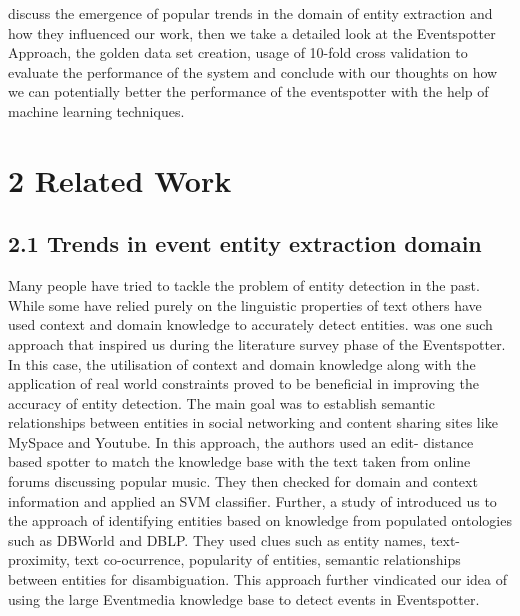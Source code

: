 \documentclass[a4paper,11pt]{report}
\begin{document}
discuss the emergence of popular trends in the domain of entity extraction and how they influenced our work, then we take a detailed look at the Eventspotter Approach, the golden data set creation, usage of 10-fold cross validation to evaluate the performance of the system and conclude with our thoughts on how we can potentially better the performance of the eventspotter with the help of machine learning techniques.



\chapter*{2 Related Work}

\section*{2.1 Trends in event entity extraction domain}
Many people have tried to tackle the problem of entity detection in the past. While some have relied purely on the linguistic properties of text others have used context and domain knowledge to accurately detect entities. \cite{Gruhl_contextand} was one such approach that inspired us during the literature survey phase of the Eventspotter. In this case, the utilisation of context and domain knowledge along with the application of real world constraints proved to be beneficial in improving the accuracy of entity detection. The main goal was to establish semantic relationships between entities in social networking and content sharing sites like MySpace and Youtube. In this approach, the authors used an edit- distance based spotter to match the knowledge base with the text taken from online forums discussing popular music. They then checked for domain and context information and applied an SVM classifier. Further, a study of \cite{Hassell06ontology-drivenautomatic} introduced us to the approach of identifying entities based on knowledge from populated ontologies such as DBWorld and DBLP. They used clues such as entity names, text-proximity, text co-ocurrence, popularity of entities, semantic relationships between entities for disambiguation. This approach further vindicated our idea of using the large Eventmedia knowledge base to detect events in Eventspotter.\newline
\end{document}
